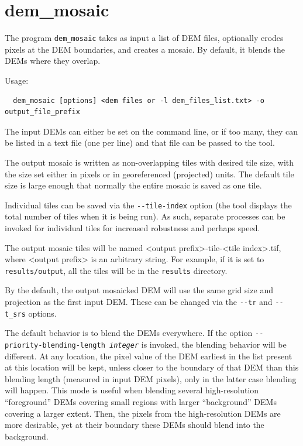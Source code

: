 \clearpage

\section{dem\_mosaic}
\label{demmosaic}

The program \texttt{dem\_mosaic} takes as input a list of \ac{DEM} files,
optionally erodes pixels at the \ac{DEM} boundaries, and creates a mosaic.
By default, it blends the DEMs where they overlap.

Usage:
\begin{verbatim}
  dem_mosaic [options] <dem files or -l dem_files_list.txt> -o output_file_prefix
\end{verbatim}

The input DEMs can either be set on the command line, or if too
many, they can be listed in a text file (one per line) and that file can
be passed to the tool.

The output mosaic is written as non-overlapping tiles with desired tile
size, with the size set either in pixels or in georeferenced (projected)
units. The default tile size is large enough that normally the entire
mosaic is saved as one tile.

Individual tiles can be saved via the \texttt{-\/-tile-index} option
(the tool displays the total number of tiles when it is being run). As
such, separate processes can be invoked for individual tiles for
increased robustness and perhaps speed.

The output mosaic tiles will be named <output prefix>-tile-<tile
index>.tif, where <output prefix> is an arbitrary string. For example,
if it is set to \texttt{results/output}, all the tiles will be in the
\texttt{results} directory.

By the default, the output mosaicked \ac{DEM} will use the same grid size and
projection as the first input \ac{DEM}. These can be changed via the
\texttt{-\/-tr} and \texttt{-\/-t\_srs} options.

The default behavior is to blend the DEMs everywhere. If the option
\texttt{-\/-priority-blending-length \textit{integer}} is invoked, the
blending behavior will be different. At any location, the pixel value of
the DEM earliest in the list present at this location will be kept,
unless closer to the boundary of that DEM than this blending length
(measured in input DEM pixels), only in the latter case blending will happen. This
mode is useful when blending several high-resolution ``foreground'' DEMs
covering small regions with larger ``background'' DEMs covering a larger
extent. Then, the pixels from the high-resolution DEMs are more
desirable, yet at their boundary these DEMs should blend into the
background.

